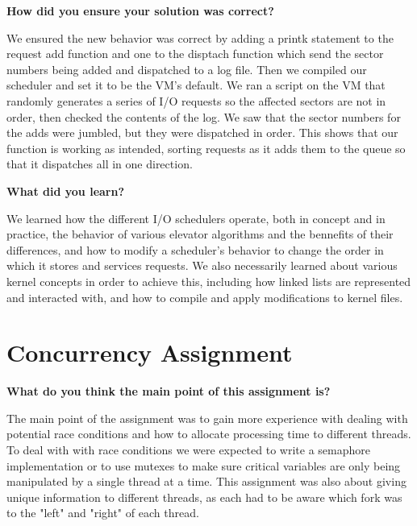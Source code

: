 \documentclass[10pt,letterpaper,draftclsnofoot,onecolumn]{IEEEtran}
\begin{document}
\bigskip

\noindent\textbf{How did you ensure your solution was correct?}
\medskip

\medskip

\noindent We ensured the new behavior was correct by adding a printk statement to the request add function and one to the disptach function which send the sector numbers being added and dispatched to a log file. Then we compiled our scheduler and set it to be the VM's default. We ran a script on the VM that randomly generates a series of I/O requests so the affected sectors are not in order, then checked the contents of the log. We saw that the sector numbers for the adds were jumbled, but they were dispatched in order. This shows that our function is working as intended, sorting requests as it adds them to the queue so that it dispatches all in one direction.\par

\bigskip

\noindent\textbf{What did you learn?}
\medskip

\medskip

\noindent We learned how the different I/O schedulers operate, both in concept and in practice, the behavior of various elevator algorithms and the bennefits of their differences, and how to modify a scheduler's behavior to change the order in which it stores and services requests. We also necessarily learned about various kernel concepts in order to achieve this, including how linked lists are represented and interacted with, and how to compile and apply modifications to kernel files.\par\pagebreak

\section{Concurrency Assignment}
\bigskip

\noindent\textbf{What do you think the main point of this assignment is?}
\medskip

\medskip

\noindent The main point of the assignment was to gain more experience with dealing with potential race conditions and how to allocate processing time to different threads. To deal with with race conditions we were expected to write a semaphore implementation or to use mutexes to make sure critical variables are only being manipulated by a single thread at a time. This assignment was also about giving unique information to different threads, as each had to be aware which fork was to the "left" and "right" of each thread.\par
\end{document}
